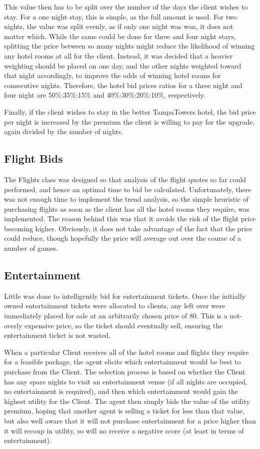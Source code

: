 \documentclass{acm_proc_article-sp}
\begin{document}
  This value then has to be split over the number of the days the client wishes to stay.  For a one night stay, this is simple, as the full amount is used.  For two nights, the value was split evenly, as if only one night was won, it does not matter which.  While the same could be done for three and four night stays, splitting the price between so many nights might reduce the likelihood of winning any hotel rooms at all for the client.  Instead, it was decided that a heavier weighting should be placed on one day, and the other nights weighted toward that night accordingly, to improve the odds of winning hotel rooms for consecutive nights.  Therefore, the hotel bid prices ratios for a three night and four night are 50\%:35\%:15\% and 40\%:30\%:20\%:10\%, respectively.
  
  Finally, if the client wishes to stay in the better TampaTowers hotel, the bid price per night is increased by the premium the client is willing to pay for the upgrade, again divided by the number of nights.
  
 \subsection{Flight Bids}
  The Flights class was designed so that analysis of the flight quotes so far could performed, and hence an optimal time to bid be calculated.  Unfortunately, there was not enough time to implement the trend analysis, so the simple heuristic of purchasing flights as soon as the client has all the hotel rooms they require, was implemented.  The reason behind this was that it avoids the risk of the flight price becoming higher.  Obviously, it does not take advantage of the fact that the price could reduce, though hopefully the price will average out over the course of a number of games.
  
 \subsection{Entertainment}
  Little was done to intelligently bid for entertainment tickets.  Once the initially owned entertainment tickets were allocated to clients, any left over were immediately placed for sale at an arbitrarily chosen price of 80.  This is a not-overly expensive price, so the ticket should eventually sell, ensuring the entertainment ticket is not wasted.
  
  When a particular Client receives all of the hotel rooms and flights they require for a feasible package, the agent elicits which entertainment would be best to purchase from the Client.  The selection process is based on whether the Client has any spare nights to visit an entertainment venue (if all nights are occupied, no entertainment is required), and then which entertainment would gain the highest utility for the Client.  The agent then simply bids the value of the utility premium, hoping that another agent is selling a ticket for less than that value, but also well aware that it will not purchase entertainment for a price higher than it will recoup in utility, so will no receive a negative score (at least in terms of entertainment).
  
\end{document}

